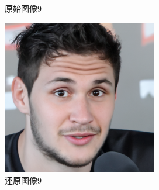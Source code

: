 \begin{figure}[H]
\begin{minipage}[b]{0.3\linewidth}
    \caption{原始图像9}
    \label{original image }
  \end{minipage}
\hspace{0.1cm}
  \begin{minipage}[b]{0.3\linewidth}
    \includegraphics[width=\linewidth]{Picture/recon/00004.png}
    \caption{还原图像9}
    \label{inpainted image}
  \end{minipage}
\end{figure}



